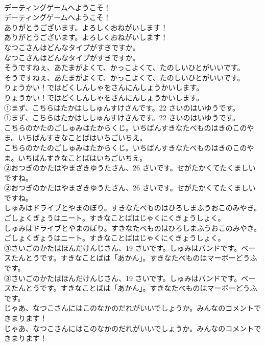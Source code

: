 \documentclass[8pt]{extreport}
\begin{document}
\begin{CJK}{UTF8}{min}
\\	デーティングゲームへようこそ！	
\\	デーティングゲームへようこそ！ 
\\	ありがとうございます。よろしくおねがいします！	
\\	ありがとうございます。よろしくおねがいします！ 
\\	なつこさんはどんなタイプがすきですか。	
\\	なつこさんはどんなタイプがすきですか。 
\\	そうですねぇ、あたまがよくて、かっこよくて、たのしいひとがいいです。	
\\	そうですねぇ、あたまがよくて、かっこよくて、たのしいひとがいいです。 
\\	りょうかい！ではどくしんしゃをさんにんしょうかいします。	
\\	りょうかい！ではどくしんしゃをさんにんしょうかいします。 
\\	①まず、こちらはたかはししゅんすけさんです。22 さいのはいゆうです。	
\\	①まず、こちらはたかはししゅんすけさんです。22 さいのはいゆうです。 
\\	こちらのかたのごしゅみはたからくじ。いちばんすきなたべものはきのこのやま。いちばんすきなことばはいちごいちえ。	
\\	こちらのかたのごしゅみはたからくじ。いちばんすきなたべものはきのこのやま。いちばんすきなことばはいちごいちえ。 
\\	②おつぎのかたはやまざきゆうたさん、26 さいです。せがたかくてたくましいですね。	
\\	②おつぎのかたはやまざきゆうたさん、26 さいです。せがたかくてたくましいですね。 
\\	しゅみはドライブとやまのぼり。すきなたべものはひろしまふうおこのみやき。ごしょくぎょうはニート。すきなことばはじゃくにくきょうしょく。	
\\	しゅみはドライブとやまのぼり。すきなたべものはひろしまふうおこのみやき。ごしょくぎょうはニート。すきなことばはじゃくにくきょうしょく。 
\\	③さいごのかたはほんだけんじさん、19 さいです。しゅみはバンドです。ベースたんとうです。すきなことばは「あかん」。すきなたべものはマーボーどうふです。	
\\	③さいごのかたはほんだけんじさん、19 さいです。しゅみはバンドです。ベースたんとうです。すきなことばは「あかん」。すきなたべものはマーボーどうふです。 
\\	じゃあ、なつこさんにはこのなかのだれがいいでしょうか。みんなのコメントできまります！	
\\	じゃあ、なつこさんにはこのなかのだれがいいでしょうか。みんなのコメントできまります！ 

\end{CJK}
\end{document}
